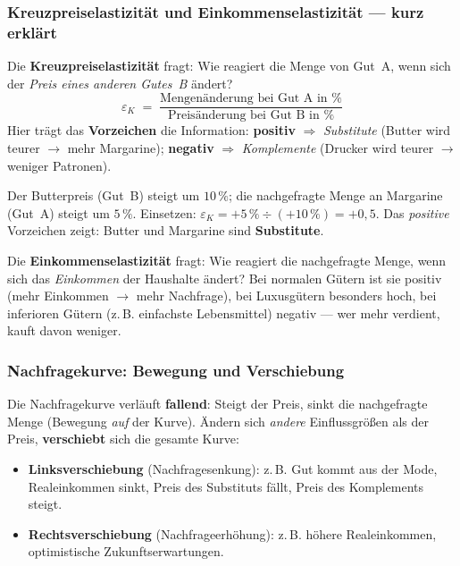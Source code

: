 \documentclass[11pt, a4paper]{article}
\begin{document}
\subsubsection{Kreuzpreiselastizität und Einkommenselastizität --- kurz erklärt}

Die \textbf{Kreuzpreiselastizität} fragt: Wie reagiert die Menge von Gut~A, wenn sich
der \emph{Preis eines anderen Gutes~B} ändert?
\[
\varepsilon_K \;=\; \frac{\text{Mengenänderung bei Gut A in \%}}{\text{Preisänderung bei Gut B in \%}}
\]
Hier trägt das \textbf{Vorzeichen} die Information: \textbf{positiv} $\Rightarrow$
\emph{Substitute} (Butter wird teurer $\rightarrow$ mehr Margarine); \textbf{negativ}
$\Rightarrow$ \emph{Komplemente} (Drucker wird teurer $\rightarrow$ weniger Patronen).

\begin{beispiel}[title={BEISPIEL: KREUZPREISELASTIZITÄT}]
Der Butterpreis (Gut~B) steigt um $10\,\%$; die nachgefragte Menge an Margarine
(Gut~A) steigt um $5\,\%$. Einsetzen:
$\varepsilon_K = +5\,\% \div (+10\,\%) = +0{,}5$. Das \emph{positive} Vorzeichen
zeigt: Butter und Margarine sind \textbf{Substitute}.
\end{beispiel}

Die \textbf{Einkommenselastizität} fragt: Wie reagiert die nachgefragte Menge, wenn
sich das \emph{Einkommen} der Haushalte ändert? Bei normalen Gütern ist sie positiv
(mehr Einkommen $\rightarrow$ mehr Nachfrage), bei Luxusgütern besonders hoch, bei
inferioren Gütern (z.\,B. einfachste Lebensmittel) negativ --- wer mehr verdient,
kauft davon weniger.

\subsubsection{Nachfragekurve: Bewegung und Verschiebung}

Die Nachfragekurve verläuft \textbf{fallend}: Steigt der Preis, sinkt die nachgefragte
Menge (Bewegung \emph{auf} der Kurve). Ändern sich \emph{andere} Einflussgrößen als der
Preis, \textbf{verschiebt} sich die gesamte Kurve:

\begin{itemize}
  \item \textbf{Linksverschiebung} (Nachfragesenkung): z.\,B. Gut kommt aus der Mode,
    Realeinkommen sinkt, Preis des Substituts fällt, Preis des Komplements steigt.
  \item \textbf{Rechtsverschiebung} (Nachfrageerhöhung): z.\,B. höhere Realeinkommen,
    optimistische Zukunftserwartungen.
\end{itemize}
\end{document}
